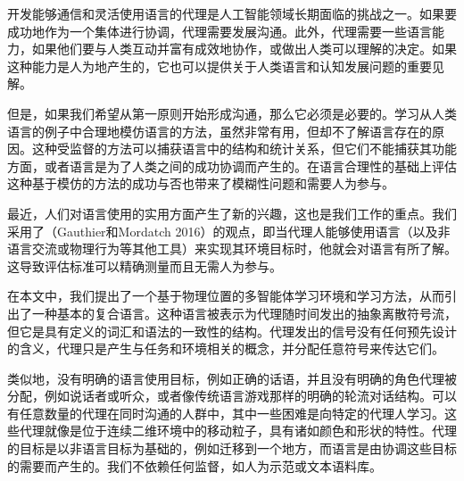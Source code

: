 开发能够通信和灵活使用语言的代理是人工智能领域长期面临的挑战之一。如果要成功地作为一个集体进行协调，代理需要发展沟通。此外，代理需要一些语言能力，如果他们要与人类互动并富有成效地协作，或做出人类可以理解的决定。如果这种能力是人为地产生的，它也可以提供关于人类语言和认知发展问题的重要见解。
\par
但是，如果我们希望从第一原则开始形成沟通，那么它必须是必要的。学习从人类语言的例子中合理地模仿语言的方法，虽然非常有用，但却不了解语言存在的原因。这种受监督的方法可以捕获语言中的结构和统计关系，但它们不能捕获其功能方面，或者语言是为了人类之间的成功协调而产生的。在语言合理性的基础上评估这种基于模仿的方法的成功与否也带来了模糊性问题和需要人为参与。
\par
最近，人们对语言使用的实用方面产生了新的兴趣，这也是我们工作的重点。我们采用了（Gauthier和Mordatch 2016）的观点，即当代理人能够使用语言（以及非语言交流或物理行为等其他工具）来实现其环境目标时，他就会对语言有所了解。这导致评估标准可以精确测量而且无需人为参与。
\par
在本文中，我们提出了一个基于物理位置的多智能体学习环境和学习方法，从而引出了一种基本的复合语言。这种语言被表示为代理随时间发出的抽象离散符号流，但它是具有定义的词汇和语法的一致性的结构。代理发出的信号没有任何预先设计的含义，代理只是产生与任务和环境相关的概念，并分配任意符号来传达它们。
\par
类似地，没有明确的语言使用目标，例如正确的话语，并且没有明确的角色代理被分配，例如说话者或听众，或者像传统语言游戏那样的明确的轮流对话结构。可以有任意数量的代理在同时沟通的人群中，其中一些困难是向特定的代理人学习。这些代理就像是位于连续二维环境中的移动粒子，具有诸如颜色和​​形状的特性。代理的目标是以非语言目标为基础的，例如迁移到一个地方，而语言是由协调这些目标的需要而产生的。我们不依赖任何监督，如人为示范或文本语料库。


